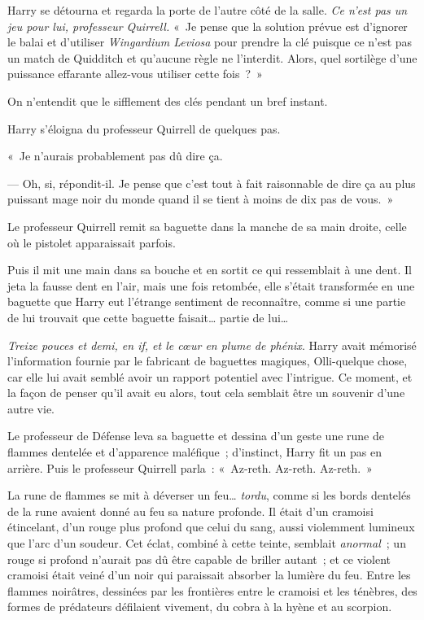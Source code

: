 Harry se détourna et regarda la porte de l'autre côté de la salle. \emph{Ce n'est pas un jeu pour lui, professeur Quirrell.} «~Je pense que la solution prévue est d'ignorer le balai et d'utiliser \emph{Wingardium Leviosa} pour prendre la clé puisque ce n'est pas un match de Quidditch et qu'aucune règle ne l'interdit. Alors, quel sortilège d'une puissance effarante allez-vous utiliser cette fois~?~»

On n'entendit que le sifflement des clés pendant un bref instant.

Harry s'éloigna du professeur Quirrell de quelques pas.

«~Je n'aurais probablement pas dû dire ça.

--- Oh, si, répondit-il. Je pense que c'est tout à fait raisonnable de dire ça au plus puissant mage noir du monde quand il se tient à moins de dix pas de vous.~»

Le professeur Quirrell remit sa baguette dans la manche de sa main droite, celle où le pistolet apparaissait parfois.

Puis il mit une main dans sa bouche et en sortit ce qui ressemblait à une dent. Il jeta la fausse dent en l'air, mais une fois retombée, elle s'était transformée en une baguette que Harry eut l'étrange sentiment de reconnaître, comme si une partie de lui trouvait que cette baguette faisait… partie de lui…

\emph{Treize pouces et demi, en if, et le cœur en plume de phénix}. Harry avait mémorisé l'information fournie par le fabricant de baguettes magiques, Olli-quelque chose, car elle lui avait semblé avoir un rapport potentiel avec l'intrigue. Ce moment, et la façon de penser qu'il avait eu alors, tout cela semblait être un souvenir d'une autre vie.

Le professeur de Défense leva sa baguette et dessina d'un geste une rune de flammes dentelée et d'apparence maléfique~; d'instinct, Harry fit un pas en arrière. Puis le professeur Quirrell parla~: «~Az-reth. Az-reth. Az-reth.~»

La rune de flammes se mit à déverser un feu… \emph{tordu}, comme si les bords dentelés de la rune avaient donné au feu sa nature profonde. Il était d'un cramoisi étincelant, d'un rouge plus profond que celui du sang, aussi violemment lumineux que l'arc d'un soudeur. Cet éclat, combiné à cette teinte, semblait \emph{anormal}~; un rouge si profond n'aurait pas dû être capable de briller autant~; et ce violent cramoisi était veiné d'un noir qui paraissait absorber la lumière du feu. Entre les flammes noirâtres, dessinées par les frontières entre le cramoisi et les ténèbres, des formes de prédateurs défilaient vivement, du cobra à la hyène et au scorpion.

